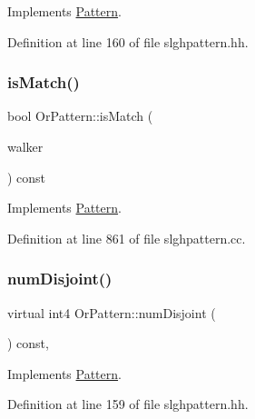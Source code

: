 Implements \mbox{\hyperlink{class_pattern_a0404a3a426d9ed2afddde9c9c67f2f14}{Pattern}}.



Definition at line 160 of file slghpattern.\+hh.

\mbox{\label{class_or_pattern_adb47d2014fe8dea89cd155122442c2c2}} 
\subsubsection{\texorpdfstring{isMatch()}{isMatch()}}
{\footnotesize\ttfamily bool Or\+Pattern\+::is\+Match (\begin{DoxyParamCaption}\item[{\mbox{\hyperlink{class_parser_walker}{Parser\+Walker}} \&}]{walker }\end{DoxyParamCaption}) const\hspace{0.3cm}{\ttfamily [virtual]}}



Implements \mbox{\hyperlink{class_pattern_a2a85729a1c78a4905bd6ee1d11ea59d5}{Pattern}}.



Definition at line 861 of file slghpattern.\+cc.

\mbox{\label{class_or_pattern_a7cf494190ca4e0258ac7c52157347f8c}} 
\subsubsection{\texorpdfstring{numDisjoint()}{numDisjoint()}}
{\footnotesize\ttfamily virtual int4 Or\+Pattern\+::num\+Disjoint (\begin{DoxyParamCaption}\item[{void}]{ }\end{DoxyParamCaption}) const\hspace{0.3cm}{\ttfamily [inline]}, {\ttfamily [virtual]}}



Implements \mbox{\hyperlink{class_pattern_acc63885639671e7813c6308d3c425ab2}{Pattern}}.



Definition at line 159 of file slghpattern.\+hh.

\mbox{\label{class_or_pattern_a75be51aafaaf737dc8ae34cc5907b66f}} 

